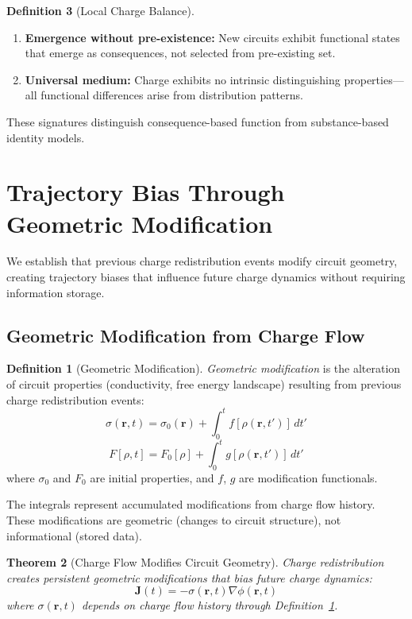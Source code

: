\documentclass[12pt,a4paper]{article}
\theoremstyle{plain}
\newtheorem{theorem}{Theorem}[section]
\theoremstyle{definition}
\newtheorem{definition}[theorem]{Definition}
\theoremstyle{remark}
\begin{document}
\begin{definition}[Local Charge Balance]
\begin{enumerate}
\item \textbf{Emergence without pre-existence:} New circuits exhibit functional states that emerge as consequences, not selected from pre-existing set.

\item \textbf{Universal medium:} Charge exhibits no intrinsic distinguishing properties—all functional differences arise from distribution patterns.
\end{enumerate}

These signatures distinguish consequence-based function from substance-based identity models.
\section{Trajectory Bias Through Geometric Modification}
\label{sec:trajectory_bias}

We establish that previous charge redistribution events modify circuit geometry, creating trajectory biases that influence future charge dynamics without requiring information storage.

\subsection{Geometric Modification from Charge Flow}

\begin{definition}[Geometric Modification]
\label{def:geometric_modification}
\emph{Geometric modification} is the alteration of circuit properties (conductivity, free energy landscape) resulting from previous charge redistribution events:
\begin{equation}
\sigma(\mathbf{r},t) = \sigma_0(\mathbf{r}) + \int_0^t f[\rho(\mathbf{r},t')] \, dt'
\end{equation}
\begin{equation}
F[\rho,t] = F_0[\rho] + \int_0^t g[\rho(\mathbf{r},t')] \, dt'
\end{equation}
where $\sigma_0$ and $F_0$ are initial properties, and $f$, $g$ are modification functionals.
\end{definition}

The integrals represent accumulated modifications from charge flow history. These modifications are geometric (changes to circuit structure), not informational (stored data).

\begin{theorem}[Charge Flow Modifies Circuit Geometry]
\label{thm:flow_modifies_geometry}
Charge redistribution creates persistent geometric modifications that bias future charge dynamics:
\begin{equation}
\mathbf{J}(t) = -\sigma(\mathbf{r},t) \nabla \phi(\mathbf{r},t)
\end{equation}
where $\sigma(\mathbf{r},t)$ depends on charge flow history through Definition~\ref{def:geometric_modification}.
\end{theorem}


\end{definition}
\end{document}
